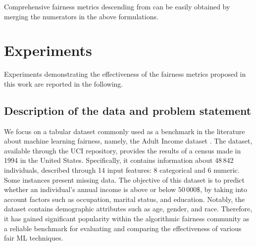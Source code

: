 \documentclass[letterpaper]{article} %
\begin{document}
\noindent Comprehensive fairness metrics descending from  can be easily obtained by merging the numerators in the above formulations.

\section{Experiments}

Experiments demonstrating the effectiveness of the fairness metrics proposed in this work are reported in the following.

\subsection{Description of the data and problem statement}
We focus on a tabular dataset commonly used as a benchmark in the literature about machine learning fairness, namely, the Adult Income dataset \cite{Dua_2019}.
%
The dataset, available through the UCI repository, provides the results of a census made in 1994 in the United States. 
Specifically, it contains information about 48\,842 individuals, described through 14 input features: 8 categorical and 6 numeric.
Some instances present missing data.
The objective of this dataset is to predict whether an individual's annual income is above or below $50\,000\$$, by taking into account factors such as occupation, marital status, and education. 
Notably, the dataset contains demographic attributes such as age, gender, and race. 
Therefore, it has gained significant popularity within the algorithmic fairness community as a reliable benchmark for evaluating and comparing the effectiveness of various fair ML techniques.
%
\end{document}
